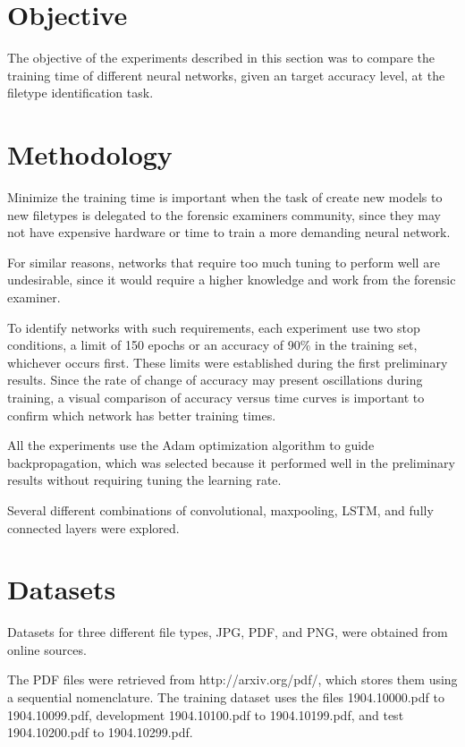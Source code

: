 \section{Objective}
The objective of the experiments described in this section 
was to compare the training time of different neural networks, given an target accuracy level, at the filetype identification task.

\section{Methodology}

Minimize the training time is important when the task of create new models to new filetypes is delegated to the forensic examiners community, since they may not have expensive hardware or time to train a more demanding neural network.

For similar reasons, networks that require too much tuning to perform well are undesirable, since it would require a higher knowledge and work from the forensic examiner.


To identify networks with such requirements, each experiment use two stop conditions, a limit of 150 epochs or an accuracy of 90\% in the training set, whichever occurs first. These limits were established during the first preliminary results. Since the rate of change of accuracy may present oscillations during training, a visual comparison of accuracy versus time curves is important to confirm which network has better training times.

All the experiments use the Adam
optimization algorithm to guide backpropagation, which was selected because it performed well in the preliminary results without requiring tuning the learning rate.

Several different combinations of convolutional, maxpooling, LSTM, and fully connected layers were explored.


\section{Datasets}

Datasets for three different file types, JPG, PDF, and PNG, were obtained from online sources.

The PDF files were retrieved from http://arxiv.org/pdf/, which stores them using a sequential nomenclature. The training dataset uses the files 1904.10000.pdf to 1904.10099.pdf, development 1904.10100.pdf to 1904.10199.pdf, and test 1904.10200.pdf to 1904.10299.pdf. 

